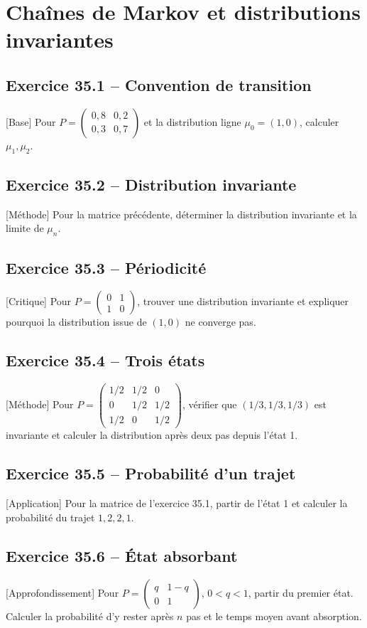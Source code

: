 \chapter{Chaînes de Markov et distributions invariantes}
\section*{Exercice 35.1 -- Convention de transition}
[Base] Pour $P=\begin{pmatrix}0{,}8&0{,}2\\0{,}3&0{,}7\end{pmatrix}$ et la distribution ligne $\mu_0=(1,0)$, calculer $\mu_1,\mu_2$.

\section*{Exercice 35.2 -- Distribution invariante}
[Méthode] Pour la matrice précédente, déterminer la distribution invariante et la limite de $\mu_n$.

\section*{Exercice 35.3 -- Périodicité}
[Critique] Pour $P=\begin{pmatrix}0&1\\1&0\end{pmatrix}$, trouver une distribution invariante et expliquer pourquoi la distribution issue de $(1,0)$ ne converge pas.

\section*{Exercice 35.4 -- Trois états}
[Méthode] Pour $P=\begin{pmatrix}1/2&1/2&0\\0&1/2&1/2\\1/2&0&1/2\end{pmatrix}$, vérifier que $(1/3,1/3,1/3)$ est invariante et calculer la distribution après deux pas depuis l'état 1.

\section*{Exercice 35.5 -- Probabilité d’un trajet}
[Application] Pour la matrice de l'exercice 35.1, partir de l'état 1 et calculer la probabilité du trajet $1,2,2,1$.

\section*{Exercice 35.6 -- État absorbant}
[Approfondissement] Pour $P=\begin{pmatrix}q&1-q\\0&1\end{pmatrix}$, $0<q<1$, partir du premier état. Calculer la probabilité d'y rester après $n$ pas et le temps moyen avant absorption.
